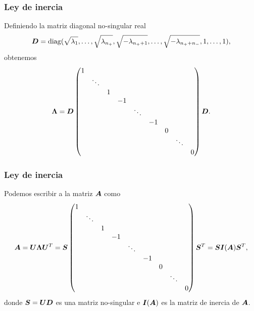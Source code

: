 \documentclass[aspectratio=169,12pt,spanish]{beamer}
\begin{document}
\begin{frame}
\frametitle{Ley de inercia}

Definiendo la matriz diagonal no-singular real
$$\bm{D} = \operatorname{diag}(\sqrt{\lambda_1}, \dots, \sqrt{\lambda_{n_+}}, \sqrt{-\lambda_{n_{+}+1}}, \dots, \sqrt{-\lambda_{n_{+}+n_{-}}}, 1, \dots, 1),$$
obtenemos
$$
\bm{\Lambda} = \bm{D} \begin{pmatrix}
1 &        &   &    &        &    &   &        &   \\
  & \ddots &   &    &        &    &   &        &   \\
  &        & 1 &    &        &    &   &        &   \\
  &        &   & -1 &        &    &   &        &   \\
  &        &   &    & \ddots &    &   &        &   \\
  &        &   &    &        & -1 &   &        &   \\
  &        &   &    &        &    & 0 &        &   \\
  &        &   &    &        &    &   & \ddots &   \\
  &        &   &    &        &    &   &        & 0 \\
\end{pmatrix}
\bm{D}.$$
  
\end{frame}


\begin{frame}
\frametitle{Ley de inercia}

Podemos escribir a la matriz $\bm{A}$ como
$$
\bm{A} = \bm{U} \bm{\Lambda} \bm{U}^T = \bm{S}
\begin{pmatrix}
1 &        &   &    &        &    &   &        &   \\
  & \ddots &   &    &        &    &   &        &   \\
  &        & 1 &    &        &    &   &        &   \\
  &        &   & -1 &        &    &   &        &   \\
  &        &   &    & \ddots &    &   &        &   \\
  &        &   &    &        & -1 &   &        &   \\
  &        &   &    &        &    & 0 &        &   \\
  &        &   &    &        &    &   & \ddots &   \\
  &        &   &    &        &    &   &        & 0 \\
\end{pmatrix}
\bm{S}^T = \bm{S} \bm{I}(\bm{A}) \bm{S}^T,$$
donde $\bm{S} = \bm{U} \bm{D}$ es una matriz no-singular e $\bm{I}(\bm{A})$ es la matriz de inercia de $\bm{A}$.

\end{frame}
\end{document}
